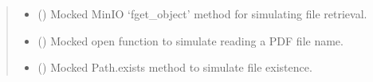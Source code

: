 \documentclass[letterpaper,10pt,english]{sphinxmanual}
\begin{document}
\begin{fulllineitems}
\begin{quote}
\begin{description}
\begin{itemize}
\item {} 
\sphinxAtStartPar
{} () \textendash{} Mocked MinIO ‘fget\_object’ method for simulating file retrieval.

\item {} 
\sphinxAtStartPar
{} () \textendash{} Mocked open function to simulate reading a PDF file name.

\item {} 
\sphinxAtStartPar
{} () \textendash{} Mocked Path.exists method to simulate file existence.

\end{itemize}

\end{description}\end{quote}

\end{fulllineitems}

\end{document}
